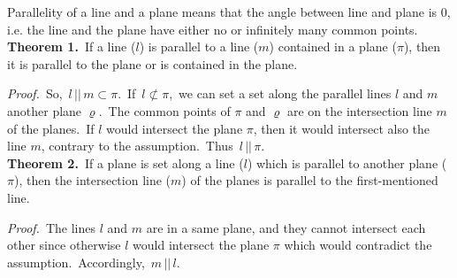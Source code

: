 \documentclass[12pt]{article}
\theoremstyle{definition}
\begin{document}
Parallelity of a line and a plane means that the angle between line and plane is 0, i.e. the line and the plane have either no or infinitely many common points.\\


\textbf{Theorem 1.}\, If a line ($l$) is parallel to a line ($m$) contained in a plane ($\pi$), then it is parallel to the plane or is contained in the plane.

{\em Proof.}\, 
So,\, $l \,||\, m \subset \pi$.\, If\, $l \not\subset \pi$,\, we can set a set along the parallel lines $l$ and $m$ another plane $\varrho$.\, The common points of $\pi$ and $\varrho$ are on the intersection line $m$ of the planes.\, If $l$ would intersect the plane $\pi$, then it would intersect also the line $m$, contrary to the assumption.\, Thus\, $l \,||\, \pi$.\\


\textbf{Theorem 2.}\, If a plane is set along a line ($l$) which is parallel to another plane ($\pi$), then the intersection line ($m$) of the planes is parallel to the first-mentioned line.

{\em Proof.}\, The lines $l$ and $m$ are in a same plane, and they cannot intersect each other since otherwise $l$ would intersect the plane $\pi$ which would contradict the assumption.\, Accordingly,\, $m \,||\, l$.
\end{document}
